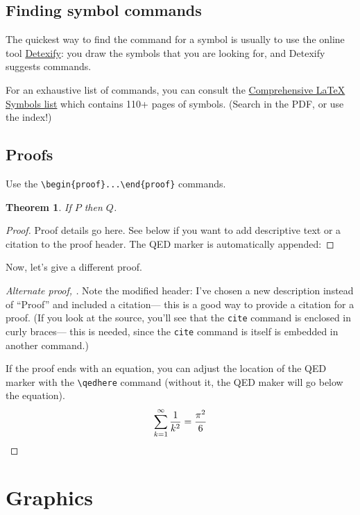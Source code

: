 \documentclass[11pt]{amsart}
\theoremstyle{theorem} %
\newtheorem{thm}{Theorem}[section] %
\theoremstyle{definition}                  %
\theoremstyle{example}                       %
\theoremstyle{remark}                       %
\numberwithin{equation}{section}
\begin{document}
\subsection{Finding symbol commands}

The quickest way to find the command for a symbol is usually to use the online tool \href{http://detexify.kirelabs.org/classify.html}{Detexify}: you draw the symbols that you are looking for, and Detexify suggests commands.

For an exhaustive list of commands, you can consult the \href{http://www.ctan.org/tex-archive/info/symbols/comprehensive/symbols-letter.pdf}{Comprehensive LaTeX Symbols list}
which contains 110+ pages of symbols. (Search in the PDF, or use the index!)

\subsection{Proofs}
Use the \verb+\begin{proof}...\end{proof}+ commands.

\begin{thm}
If $P$ then $Q$.
\end{thm}

\begin{proof}
Proof details go here. See below if you want to add descriptive text or a citation to the proof header. The QED marker is automatically appended:
\end{proof}

Now, let's give a different proof. 
\begin{proof}[Alternate proof, {\cite[\S 3]{cg}}]
Note the modified header: I've chosen a new description instead of ``Proof'' and included a citation---  this is a good way to provide a citation for a proof. 
(If you look at the source, you'll see that the \texttt{cite} command is enclosed in curly braces--- this is needed,  since the \texttt{cite} command is itself is embedded in another command.)

If the proof ends with an equation, you can adjust the location of the QED marker with the \verb+\qedhere+ command (without it, the QED maker will go below the equation). 
\begin{equation}
\sum_{k=1}^\infty \frac{1}{k^2}  = \frac{\pi^2}{6} \qedhere
\end{equation}
\end{proof}


\section{Graphics}
\end{document}
